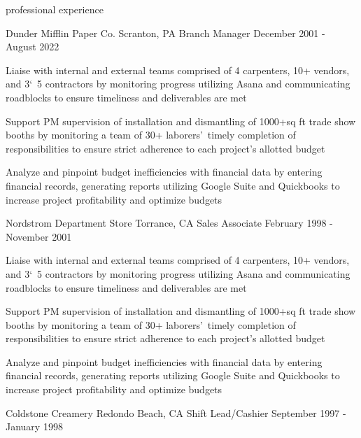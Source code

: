 \documentclass{resume} %
\begin{document}
	\begin{rSection}{professional experience}
		\begin{rPlace}
			{Dunder Mifflin Paper Co.}
			{Scranton, PA}
			{Branch Manager}
			{December 2001 - August 2022}
			
			\begin{rItems}
				\item {Liaise with internal and external teams comprised of 4 carpenters, 10+ vendors, and 3\char`~5 contractors by monitoring progress utilizing Asana and communicating roadblocks to ensure timeliness and deliverables are met}
				\item {Support PM supervision of installation and dismantling of 1000+sq ft trade show booths by monitoring a team of 30+ laborers\rq\ timely completion of responsibilities to ensure strict adherence to each project\rq s allotted budget}
				\item {Analyze and pinpoint budget inefficiencies with financial data by entering financial records, generating reports utilizing Google Suite and Quickbooks to increase project profitability and optimize budgets}
			\end{rItems}
		\end{rPlace}
		
		\begin{rPlace}
			{Nordstrom Department Store}
			{Torrance, CA}
			{Sales Associate}
			{February 1998 - November 2001}
			
			\begin{rItems}
				\item {Liaise with internal and external teams comprised of 4 carpenters, 10+ vendors, and 3\char`~5 contractors by monitoring progress utilizing Asana and communicating roadblocks to ensure timeliness and deliverables are met}
				\item {Support PM supervision of installation and dismantling of 1000+sq ft trade show booths by monitoring a team of 30+ laborers\rq\ timely completion of responsibilities to ensure strict adherence to each project\rq s allotted budget}
				\item {Analyze and pinpoint budget inefficiencies with financial data by entering financial records, generating reports utilizing Google Suite and Quickbooks to increase project profitability and optimize budgets}
			\end{rItems}
		\end{rPlace}
		
		\begin{rPlace}
			{Coldstone Creamery}
			{Redondo Beach, CA}
			{Shift Lead/Cashier}
			{September 1997 - January 1998}
			

\end{rPlace}
\end{rSection}
\end{document}
